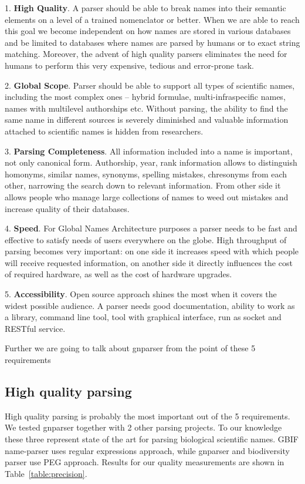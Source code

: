 \documentclass{bmcart}
\begin{document}
1. \textbf{High Quality}. A parser should be able to break names into their
semantic elements on a level of a trained nomenclator or better. When we are
able to reach this goal we become independent on how names are stored in
various databases and be limited to databases where names are parsed by humans
or to exact string matching. Moreover, the advent of high quality parsers
eliminates the need for humans to perform this very expensive, tedious and
error-prone task.

2. \textbf{Global Scope}. Parser should be able to support all types of
scientific names, including the most complex ones -- hybrid formulae,
multi-infraspecific names, names with multilevel authorships etc. Without
parsing, the ability to find the same name in different sources is severely
diminished and valuable information attached to scientific names is hidden
from researchers.

3. \textbf{Parsing Completeness}. All information included into a name is
important, not only canonical form. Authorship, year, rank information allows
to distinguish homonyms, similar names, synonyms, spelling mistakes,
chresonyms from each other, narrowing the search down to relevant information.
From other side it allows people who manage large collections of names to weed
out mistakes and increase quality of their databases.

4. \textbf{Speed}. For Global Names Architecture purposes a parser needs to be
fast and effective to satisfy needs of users everywhere on the globe.  High
throughput of parsing becomes very important: on one side it increases speed
with which people will receive requested information, on another side it
directly influences the cost of required hardware, as well as the cost of
hardware upgrades.

5. \textbf{Accessibility}. Open source approach shines the most when it covers
the widest possible audience. A parser needs good documentation, ability to
work as a library, command line tool, tool with graphical interface, run as
socket and RESTful service.

Further we are going to talk about gnparser from the point of these 5
requirements

\subsection*{High quality parsing}

High quality parsing is probably the most important out of the 5 requirements.
We tested gnparser together with 2 other parsing projects. To our knowledge
these three represent state of the art for parsing biological scientific
names. GBIF name-parser uses regular expressions approach, while gnparser and
biodiversity parser use PEG approach. Results for our quality measurements are
shown in Table~\ref{table:precision}.
\end{document}
